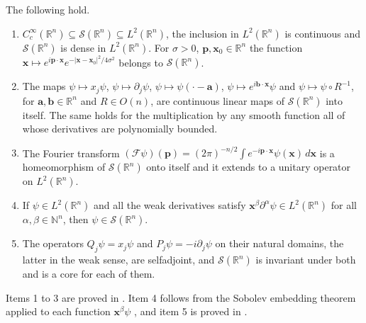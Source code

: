 \begin{proposition}\label{prop:schwartz-properties}
	The following hold.
	\begin{enumerate}
		\item $C_c^\infty(\mathbb{R}^n)\subseteq\mathcal{S}(\mathbb{R}^n)\subseteq L^2(\mathbb{R}^n)$, the inclusion in $L^2(\mathbb{R}^n)$ is continuous and $\mathcal{S}(\mathbb{R}^n)$ is dense in $L^2(\mathbb{R}^n)$. For $\sigma>0$, $\mathbf{p},\mathbf{x}_0\in\mathbb{R}^n$ the function $\mathbf{x}\mapsto e^{i\mathbf{p}\cdot\mathbf{x}}e^{-|\mathbf{x}-\mathbf{x}_0|^2/4\sigma^2}$ belongs to $\mathcal{S}(\mathbb{R}^n)$.
		\item The maps $\psi\mapsto x_j\psi$, $\psi\mapsto\partial_j\psi$, $\psi\mapsto\psi(\cdot-\mathbf{a})$, $\psi\mapsto e^{i\mathbf{b}\cdot\mathbf{x}}\psi$ and $\psi\mapsto\psi\circ R^{-1}$, for $\mathbf{a},\mathbf{b}\in\mathbb{R}^n$ and $R\in O(n)$, are continuous linear maps of $\mathcal{S}(\mathbb{R}^n)$ into itself. The same holds for the multiplication by any smooth function all of whose derivatives are polynomially bounded.
		\item The Fourier transform $(\mathcal{F}\psi)(\mathbf{p})=(2\pi)^{-n/2}\int e^{-i\mathbf{p}\cdot\mathbf{x}}\psi(\mathbf{x})\,d\mathbf{x}$ is a homeomorphism of $\mathcal{S}(\mathbb{R}^n)$ onto itself and it extends to a unitary operator on $L^2(\mathbb{R}^n)$.
		\item If $\psi\in L^2(\mathbb{R}^n)$ and all the weak derivatives satisfy $\mathbf{x}^\beta\partial^\alpha\psi\in L^2(\mathbb{R}^n)$ for all $\alpha,\beta\in\mathbb{N}^n$, then $\psi\in\mathcal{S}(\mathbb{R}^n)$.
		\item The operators $Q_j\psi=x_j\psi$ and $P_j\psi=-i\partial_j\psi$ on their natural domains, the latter in the weak sense, are selfadjoint, and $\mathcal{S}(\mathbb{R}^n)$ is invariant under both and is a core for each of them.
	\end{enumerate}
\end{proposition}

\noindent Items 1 to 3 are proved in \cite[TODO-location]{TODO-RS03}. Item 4 follows from the Sobolev embedding theorem applied to each function $\mathbf{x}^\beta\psi$ \cite[TODO-location]{TODO-Sobolev}, and item 5 is proved in \cite[TODO-location]{TODO-RS03}.
